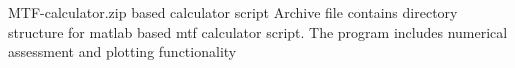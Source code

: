 \documentclass[../main.tex]{subfiles}%
\begin{document}
%
    \Xsupplement%
    \begin{supplement}%
        \supplementcaption%
            {MTF-calculator.zip}%
            { based  calculator script}%
            {Archive file contains directory structure for \gls{matlab} based \gls{mtf} calculator script.
            The program includes numerical assessment and plotting functionality}%
        \label{sup:mtf-calculator}%
    \end{supplement}%
\end{document}
